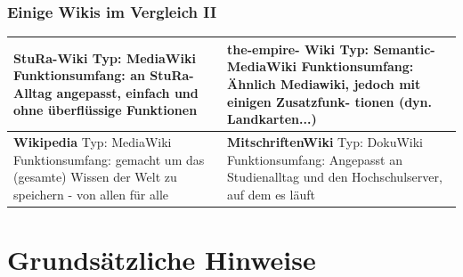 \documentclass{beamer}              %
\begin{document}
\begin{frame}
  \frametitle{Einige Wikis im Vergleich II}

  \begin{table}
    \caption{Wikivergleich2}
    \label{tab:Wikivergleich2}

    \begin{center}
      \begin{longtable}{|l|l|}
        \hline
        \textbf{StuRa-Wiki} Typ: MediaWiki Funktionsumfang: an StuRa- Alltag angepasst, einfach und ohne überflüssige Funktionen & \textbf{the-empire- Wiki} Typ: Semantic-MediaWiki Funktionsumfang: Ähnlich Mediawiki, jedoch mit einigen Zusatzfunk- tionen (dyn. Landkarten...) \\ 
        \hline
        \textbf{Wikipedia} Typ: MediaWiki Funktionsumfang: gemacht um das (gesamte) Wissen der Welt zu speichern - von allen für alle & \textbf{MitschriftenWiki} Typ: DokuWiki Funktionsumfang: Angepasst an Studienalltag und den Hochschulserver, auf dem es läuft \\ 
        \hline
      \end{longtable}
    \end{center}
  \end{table}

\end{frame}

\section{Grundsätzliche Hinweise}
\end{document}
